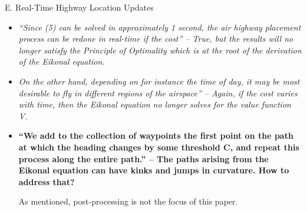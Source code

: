 \documentclass[submit]{aiaa-pretty}
\begin{document}
E. Real-Time Highway Location Updates
\begin{itemize}
\item \textit{``Since (5) can be solved in approximately 1 second, the air highway placement process can be redone in real-time if the cost'' – True, but the results will no longer satisfy the Principle of Optimality which is at the root of the derivation of the Eikonal equation.}
\item \textit{On the other hand, depending on for instance the time of day, it may be most desirable to fly in different regions of the airspace'' – Again, if the cost varies with time, then the Eikonal equation no longer solves for the value function V.}
\item \textbf{``We add to the collection of waypoints the first point on the path at which the heading changes by some threshold C, and repeat this process along the entire path.'' – The paths arising from the Eikonal equation can have kinks and jumps in curvature. How to address that?}

As mentioned, post-processing is not the focus of this paper.
\end{itemize}
\end{document}
